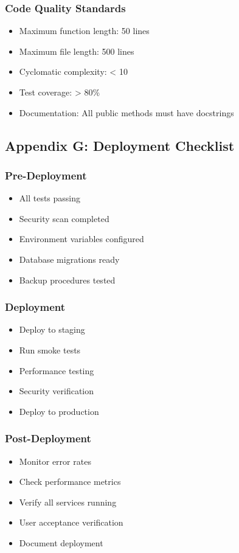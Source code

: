 \documentclass[12pt,a4paper]{article}
\begin{document}
\subsubsection{Code Quality Standards}
\begin{itemize}
    \item Maximum function length: 50 lines
    \item Maximum file length: 500 lines
    \item Cyclomatic complexity: < 10
    \item Test coverage: > 80\%
    \item Documentation: All public methods must have docstrings
\end{itemize}

\newpage

\subsection{Appendix G: Deployment Checklist}

\subsubsection{Pre-Deployment}
\begin{itemize}
    \item[$\square$] All tests passing
    \item[$\square$] Security scan completed
    \item[$\square$] Environment variables configured
    \item[$\square$] Database migrations ready
    \item[$\square$] Backup procedures tested
\end{itemize}

\subsubsection{Deployment}
\begin{itemize}
    \item[$\square$] Deploy to staging
    \item[$\square$] Run smoke tests
    \item[$\square$] Performance testing
    \item[$\square$] Security verification
    \item[$\square$] Deploy to production
\end{itemize}

\subsubsection{Post-Deployment}
\begin{itemize}
    \item[$\square$] Monitor error rates
    \item[$\square$] Check performance metrics
    \item[$\square$] Verify all services running
    \item[$\square$] User acceptance verification
    \item[$\square$] Document deployment
\end{itemize}
\end{document}
